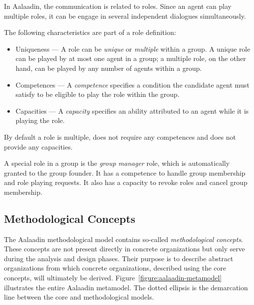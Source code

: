 In Aalaadin, the communication is related to roles. Since an agent can play multiple roles, it can be engage in several independent dialogues simultaneously.

The following characteristics are part of a role definition:
\begin{itemize}
	\item Uniqueness ---  A role can be \textit{unique} or \textit{multiple} within a group.
	A unique role can be played by at most one agent in a group; a multiple role, on the other hand, can be played by any number of agents within a group. 
	\item Competences --- A \textit{competence} specifies a condition the candidate agent must satisfy to be eligible to play the role within the group. 
	\item Capacities --- A \textit{capacity} specifies an ability attributed to an agent while it is playing the role.
\end{itemize}
By default a role is multiple, does not require any competences and does not provide any capacities.

A special role in a group is the \textit{group manager} role, which is automatically granted to the group founder.
It has a competence to handle group membership and role playing requests.
It also has a capacity to revoke roles and cancel group membership.

\subsection{Methodological Concepts}

The Aalaadin methodological model contains so-called \textit{methodological concepts}.
These concepts are not present directly in concrete organizations but only serve during the analysis and design phases.
Their purpose is to describe abstract organizations from which concrete organizations, described using the core concepts, will ultimately be derived.
Figure~\ref{figure:aalaadin-metamodel} illustrates the entire Aalaadin metamodel. The dotted ellipsis is the demarcation line between the core and methodological models.

